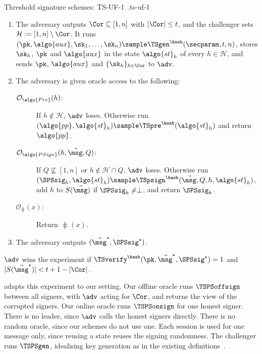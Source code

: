 \begin{experimentbox}{Threshold signature schemes: TS-UF-1~\cite{C:BCKMTZ22}.}{ts-uf-1}

  \begin{enumerate}

    \item The adversary outputs $\Cor \subseteq [1, n]$ with $|\Cor| \leq t$,
and the challenger sets $\mathcal{H} := [1, n] \setminus \Cor$. It runs $(\pk,
\algo{aux}, \sk_1, \ldots, \sk_n) \sample \TSgen^{\hash}(\secparam, t, n)$, stores
$\sk_h$, $\pk$ and $\algo{aux}$ in the state $\algo{st}_h$ of every $h \in
\mathcal{H}$, and sends $\pk$, $\algo{aux}$ and $\{\sk_h\}_{h \in \Cor}$ to
$\adv$.

    \item The adversary is given oracle access to the following:

      \begin{description}

	\item[$\mathcal{O}_{\algo{Pre}}(h)$:] If $h \notin \mathcal{H}$, $\adv$
loses. Otherwise run $(\algo{pp}, \algo{st}_h) \sample
\TSpre^{\hash}(\algo{st}_h)$ and return $\algo{pp}$.

	\item[$\mathcal{O}_{\algo{PSign}}(h, \vec{\msg}, Q)$:] If $Q \not\subseteq
[1, n]$ or $h \notin \mathcal{H} \cap Q$, $\adv$ loses. Otherwise run
$(\SPSsig_h, \algo{st}_h) \sample \TSpsign^{\hash}(\vec{\msg}, Q, h,
\algo{st}_h)$, add $h$ to $S(\vec{\msg})$ if $\SPSsig_h \neq \perp$, and return
$\SPSsig_h$.

	\item[$\mathcal{O}_{\hash}(x)$:] Return $\hash(x)$.

      \end{description}

    \item The adversary outputs $(\vec{\msg}^\star, \SPSsig^\star)$.

  \end{enumerate}

  $\adv$ wins the experiment if $\TSverify^{\hash}(\pk, \vec{\msg}^\star,
\SPSsig^\star) = 1$ and $|S(\vec{\msg}^\star)| < t + 1 - |\Cor|$.

\end{experimentbox}

 adapts this experiment to our setting. Our offline
oracle runs $\TSPSoffsign$ between all signers, with $\adv$ acting for $\Cor$,
and returns the view of the corrupted signers. Our online oracle runs
$\TSPSonsign$ for one honest signer. There is no leader, since $\adv$ calls the
honest signers directly. There is no random oracle, since our schemes do not use
one. Each session is used for one message only, since reusing a state reuses the
signing randomness. The challenger runs $\TSPSgen$, idealising key generation as
in the existing definitions~\cite{C:BCKMTZ22,C:CriKomMal23}.

